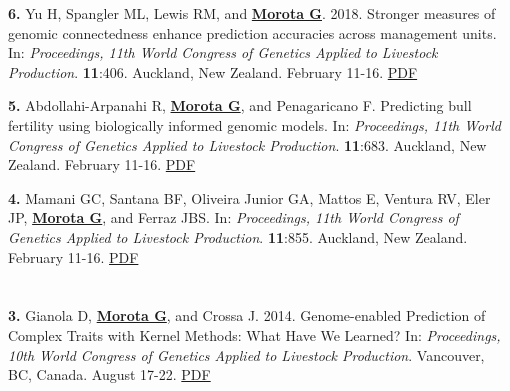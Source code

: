 \documentclass[margin,line,10pt]{res}
\newenvironment{list1}{
  \begin{list}{\ding{113}}{%
      \setlength{\itemsep}{0in}
      \setlength{\parsep}{0in} \setlength{\parskip}{0in}
      \setlength{\topsep}{0in} \setlength{\partopsep}{0in} 
      \setlength{\leftmargin}{0.17in}}}{\end{list}}
\begin{document}
\begin{resume}
\begin{list1}
\item [\bf{6}.] Yu H, Spangler ML, Lewis RM, and {\bf \underline{Morota G}}. 2018. 
Stronger measures of genomic connectedness enhance prediction accuracies across management units. In: \emph{Proceedings, 11th World Congress of Genetics Applied to Livestock Production}. \textbf{11}:406. Auckland, New Zealand. February 11-16.
\textcolor{blue}{\href{http://www.wcgalp.org/proceedings/2018/stronger-measures-genomic-connectedness-enhance-prediction-accuracies-across}{PDF}}

\vspace{0.5cm}

\item [\bf{5}.] Abdollahi-Arpanahi R, {\bf \underline{Morota G}}, and Penagaricano F. Predicting bull fertility using biologically informed genomic models.  In: \emph{Proceedings, 11th World Congress of Genetics Applied to Livestock Production}. \textbf{11}:683. Auckland, New Zealand. February 11-16. \textcolor{blue}{\href{http://www.wcgalp.org/proceedings/2018/predicting-bull-fertility-using-biologically-informed-genomic-models}{PDF}}

  \vspace{0.5cm}
  
\item [\bf{4}.] Mamani GC, Santana BF, Oliveira Junior GA, Mattos E, Ventura RV, Eler JP, {\bf \underline{Morota G}}, and Ferraz JBS. In: \emph{Proceedings, 11th World Congress of Genetics Applied to Livestock Production}. \textbf{11}:855. Auckland, New Zealand. February 11-16. \textcolor{blue}{\href{http://www.wcgalp.org/proceedings/2018/effect-inbreeding-productive-traits-nellore-cattle}{PDF}} 

  
\end{list1}

\section{}
\begin{list1}
\item [\bf{3}.] Gianola D, {\bf \underline{Morota G}}, and Crossa J. 2014. 
Genome-enabled Prediction of Complex Traits with Kernel Methods: What Have We Learned? In: \emph{Proceedings, 10th World Congress of Genetics Applied to Livestock Production}. Vancouver, BC, Canada. August 17-22.  
\textcolor{blue}{\href{http://www.morotalab.org/publications/pdf/gianola2014WCGALP.pdf}{PDF}}  


\vspace{0.5cm}


\end{list1}
\end{resume}
\end{document}
